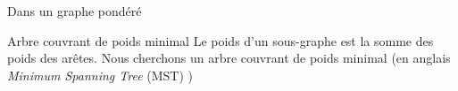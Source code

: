 \documentclass[10pt,xcolor=dvipsnames]{beamer}
\begin{document}
\begin{frame}{Dans un graphe pondéré}
\begin{alertblock}{Arbre couvrant de poids minimal}
Le poids d'un sous-graphe est la somme des poids des arêtes. Nous cherchons un \alert{arbre couvrant de poids minimal} (en anglais \textit{Minimum Spanning Tree} (MST) )
\end{alertblock}


\end{frame}
\end{document}
